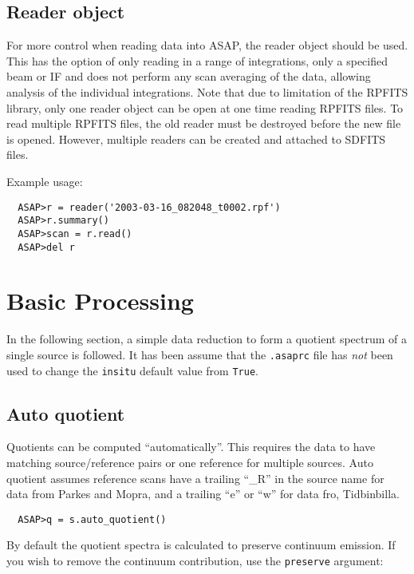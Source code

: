 \documentclass[11pt]{article}
\newcommand{\cmd}[1]{{\tt #1}}
\begin{document}
\subsection{Reader object}

For more control
when reading data into ASAP, the reader object should be used.  This
has the option of only reading in a range of integrations, only a
specified beam or IF and does not perform any scan averaging of the
data, allowing analysis of the individual integrations.  Note that due
to limitation of the RPFITS library, only one reader object can be
open at one time reading RPFITS files.  To read multiple RPFITS files,
the old reader must be destroyed before the new file is opened.
However, multiple readers can be created and attached to SDFITS files.


Example usage:

\begin{verbatim}
  ASAP>r = reader('2003-03-16_082048_t0002.rpf')
  ASAP>r.summary()
  ASAP>scan = r.read()
  ASAP>del r
\end{verbatim}

\section{Basic Processing}

In the following section, a simple data reduction to form a quotient
spectrum of a single source is followed.  It has been assume that the
\cmd{.asaprc} file has {\em not} been used to change the \cmd{insitu}
default value from \cmd{True}.

\subsection{Auto quotient}
Quotients can be computed ``automatically''. This
requires the data to have matching source/reference pairs or one
reference for multiple sources. Auto quotient assumes reference scans
have a trailing ``\_R'' in the source name for data from Parkes and
Mopra, and a trailing ``e'' or ``w'' for data fro, Tidbinbilla.

\begin{verbatim}
  ASAP>q = s.auto_quotient()
\end{verbatim}

By default the quotient spectra is calculated
to preserve continuum emission. If you wish to remove the continuum
contribution, use the \cmd{preserve} argument:
\end{document}

